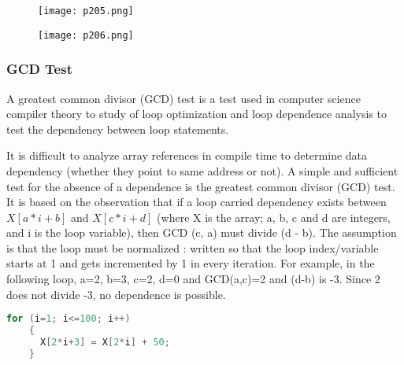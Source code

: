 \begin{figure}[H]
	\centering
	\texttt{[image: p205.png]}
	\caption{}
	\label{fig:p205}
\end{figure}

\begin{figure}[H]
	\centering
	\texttt{[image: p206.png]}
	\caption{}
	\label{fig:p206}
\end{figure}

\subsubsection{GCD Test}
A greatest common divisor (GCD) test is
a test used in computer science compiler theory to study of
loop optimization and loop dependence analysis to test the dependency
between loop statements. \cite{GCDtestW13:online}

It is difficult to analyze array references in compile time to
determine data dependency (whether they point to same address or not).
A simple and sufficient test for the absence of a dependence is
the greatest common divisor (GCD) test. It is based on the observation
that if a loop carried dependency exists between $X[a*i + b]$ and $X[c*i + d]$
(where X is the array; a, b, c and d are integers, and i is the loop variable),
then GCD (c, a) must divide (d - b). The assumption is that the loop must
be normalized : written so that the loop index/variable starts at 1 and
gets incremented by 1 in every iteration. For example, in the following
loop, a=2, b=3, c=2, d=0 and GCD(a,c)=2 and (d-b) is -3. Since 2
does not divide -3, no dependence is possible.

\begin{lstlisting}[language=C,frame=single ,label = lst:expression1]
	for (i=1; i<=100; i++)
	{
	  X[2*i+3] = X[2*i] + 50;
	}
\end{lstlisting}